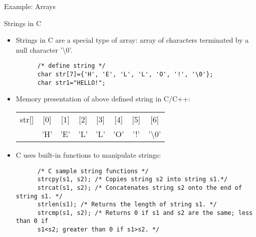 \documentclass[10pt,t]{beamer}
\begin{document}
\begin{frame}[fragile]{Example: Arrays}
  
\end{frame}

\begin{frame}{Strings in C}
  \begin{itemize}
  \item Strings in C are a special type of array: array of characters terminated by a null character '\textbackslash{}0'.

    \begin{lstlisting}
      /* define string */
      char str[7]={'H', 'E', 'L', 'L', 'O', '!', '\0'};
      char str1="HELLO!";
    \end{lstlisting}

  \item Memory presentation of above defined string in C/C++:

    \begin{tabular}{|c|c|c|c|c|c|c|c|}
      \hline
      str[] & [0] & [1] & [2] & [3] & [4] & [5] & [6] \\
      \cline{2-8}
      & 'H' & 'E' & 'L' & 'L' & 'O' & '!' & '\textbackslash{}0' \\
     \hline
    \end{tabular}

  \item C uses built-in functions to manipulate strings:
    \begin{lstlisting}
      /* C sample string functions */
      strcpy(s1, s2); /* Copies string s2 into string s1.*/
      strcat(s1, s2); /* Concatenates string s2 onto the end of string s1. */
      strlen(s1); /* Returns the length of string s1. */
      strcmp(s1, s2); /* Returns 0 if s1 and s2 are the same; less than 0 if
      s1<s2; greater than 0 if s1>s2. */
    \end{lstlisting}
  \end{itemize}

  
\end{frame}
\end{document}
